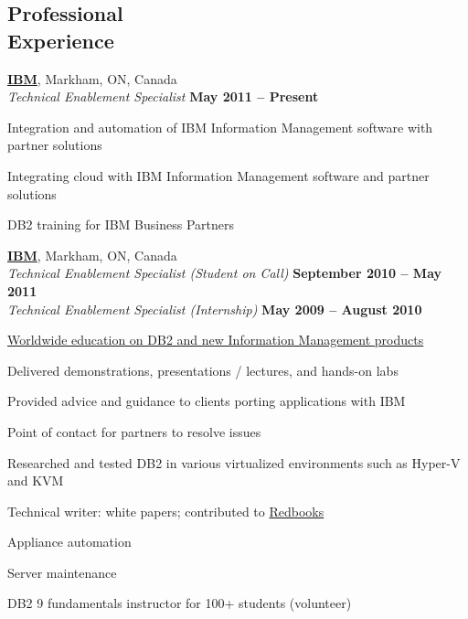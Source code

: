 \documentclass[margin,line]{resume}
\begin{document}
\begin{resume}
\section{\mysidestyle Professional\\Experience}

	\textbf{\href{http://www.ibm.com/}{IBM}}, Markham, ON, Canada					\vspace{2mm}\\\vspace{1mm}
	\textsl{Technical Enablement Specialist}				\hfill\textbf{May 2011 -- Present}		\\\vspace{-3mm}
	\begin{list2}
		\item Integration and automation of IBM Information Management software with partner solutions
		\item Integrating cloud with IBM Information Management software and partner solutions
		\item DB2 training for IBM Business Partners
	\end{list2}
	\textbf{\href{http://www.ibm.com/}{IBM}}, Markham, ON, Canada					\vspace{2mm}\\\vspace{1mm}
	\textsl{Technical Enablement Specialist (Student on Call)}		\hfill\textbf{September 2010 -- May 2011}	\\
	\textsl{\hspace*{1.0mm}Technical Enablement Specialist (Internship)}	\hfill\textbf{May 2009 -- August 2010}		\\\vspace{-1.5mm}
	\begin{list2}
		\item \href{http://www.ibm.com/developerworks/data/bootcamps}{Worldwide education on DB2 and new Information Management products}
		\item Delivered demonstrations, presentations / lectures, and hands-on labs
		\item Provided advice and guidance to clients porting applications with IBM
		\item Point of contact for partners to resolve issues
		\item Researched and tested DB2 in various virtualized environments such as Hyper-V and KVM
		\item Technical writer: white papers; contributed to \href{http://www.redbooks.ibm.com/abstracts/sg247805.html}{Redbooks}
		\item Appliance automation
		\item Server maintenance
		\item DB2 9 fundamentals instructor for 100+ students (volunteer)
	\end{list2}


\end{resume}
\end{document}
